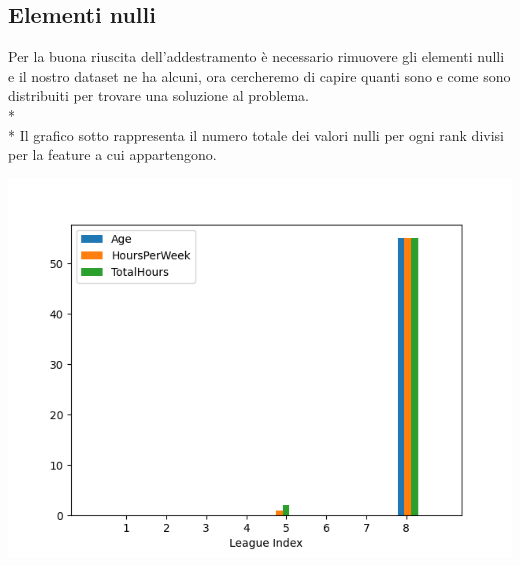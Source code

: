 \subsection{Elementi nulli}\label{ssec:nulli}
\normalsize
Per la buona riuscita dell’addestramento è necessario rimuovere gli elementi nulli e il nostro dataset ne ha alcuni, ora cercheremo di capire quanti sono e come sono distribuiti per trovare una soluzione al problema.\\*\\*
Il grafico sotto rappresenta il numero totale dei valori nulli per ogni rank divisi per la feature a cui appartengono.
\begin{center}
	\includegraphics[scale=0.9]{../figures/Nan_distribuzione.PNG}
\end{center}